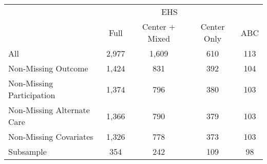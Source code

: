 \begin{tabular}{lcccc}
\toprule 
\midrule 
 & \multicolumn{3}{c}{EHS} &  \\
 \cmidrule(lr){2-4} 
 & Full & Center $+$ Mixed & Center Only & ABC \\
\midrule 
All & 2,977 & 1,609 & 610 & 113 \\
Non-Missing Outcome & 1,424 & 831 & 392 & 104 \\
Non-Missing Participation & 1,374 & 796 & 380 & 103 \\
Non-Missing Alternate Care & 1,366 & 790 & 379 & 103 \\
Non-Missing Covariates & 1,326 & 778 & 373 & 103 \\
Subsample & 354 & 242 & 109 & 98 \\
\midrule 
\bottomrule 
\end{tabular}
